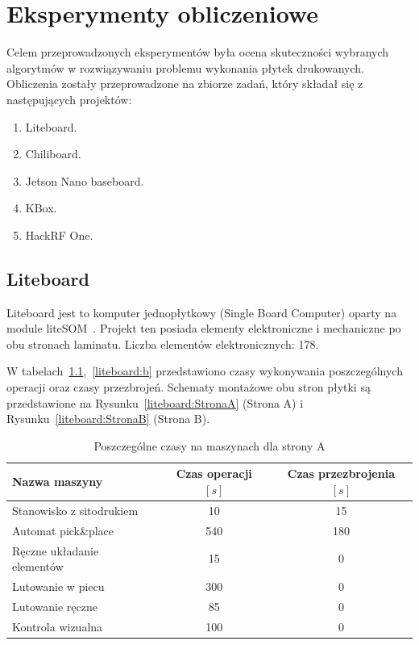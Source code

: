 \chapter{Eksperymenty obliczeniowe}

Celem przeprowadzonych eksperymentów była ocena skuteczności wybranych algorytmów w rozwiązywaniu problemu wykonania płytek drukowanych. Obliczenia zostały przeprowadzone na zbiorze zadań, który składał się z następujących projektów:
\begin{enumerate}
	\item Liteboard.
	\item Chiliboard.
	\item Jetson Nano baseboard.
	\item KBox.
	\item HackRF One.
\end{enumerate}

\section{Liteboard}

Liteboard jest to komputer jednopłytkowy (Single Board Computer) oparty na module liteSOM~\cite{liteboard}. Projekt ten posiada elementy elektroniczne i mechaniczne po obu stronach laminatu. Liczba elementów elektronicznych: 178.

\breakparagraph{}
W tabelach~\ref{liteboard:A},\ \ref{liteboard:b} przedstawiono czasy wykonywania poszczególnych operacji oraz czasy przezbrojeń. Schematy montażowe obu stron płytki są przedstawione na Rysunku~\ref{liteboard:StronaA} (Strona A) i Rysunku~\ref{liteboard:StronaB} (Strona B).

\begin{table}[H]
	\centering
	\caption{Poszczególne czasy na maszynach dla strony A}
	\begin{tabular}{lcc}
		\toprule
		Nazwa maszyny                 & Czas operacji $[s]$ & Czas przezbrojenia $[s]$ \\
		\midrule
		Stanowisko z sitodrukiem      & 10                  & 15                       \\
		Automat pick\&place           & 540                 & 180                      \\
		Ręczne układanie elementów & 15                  & 0                        \\
		Lutowanie w piecu             & 300                 & 0                        \\
		Lutowanie ręczne             & 85                  & 0                        \\
		Kontrola wizualna             & 100                 & 0                        \\
		\bottomrule
	\end{tabular}
	\label{liteboard:A}
\end{table}

